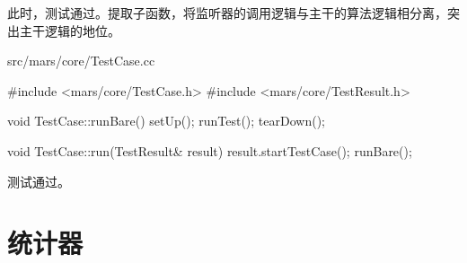\begin{content}
此时，测试通过。提取子函数，将监听器的调用逻辑与主干的算法逻辑相分离，突出主干逻辑的地位。

\begin{nodiff}{src/mars/core/TestCase.cc}
 \begin{c++}
#include <mars/core/TestCase.h>
#include <mars/core/TestResult.h>

void TestCase::runBare() {
  setUp();
  runTest();
  tearDown();
}

void TestCase::run(TestResult& result) {
  result.startTestCase();
  runBare();
}
 \end{c++}
\end{nodiff}

测试通过。

\end{content}

\section{统计器}

